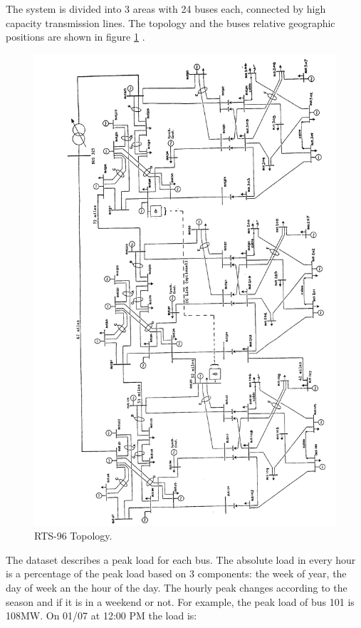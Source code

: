 \documentclass[12pt,LUDisStyle,twosided]{book}
\begin{document}
The system is divided into 3 areas with 24 buses each, connected by high capacity transmission lines. The topology and the buses relative geographic positions are shown in figure \ref{fig:ieeetopology} \cite{wongieee}.

\begin{figure}[H]
  \includegraphics[width=\textwidth,height=\textheight,keepaspectratio]{ieeetopology.png}
  \caption{RTS-96 Topology.}
  \label{fig:ieeetopology}
\end{figure}

The dataset describes a peak load for each bus. The absolute load in every hour is a percentage of the peak load based on 3 components: the week of year, the day of week an the hour of the day. The hourly peak changes according to the season and if it is in a weekend or not. For example, the peak load of bus 101 is 108MW. On 01/07 at 12:00 PM the load is:
\end{document}
